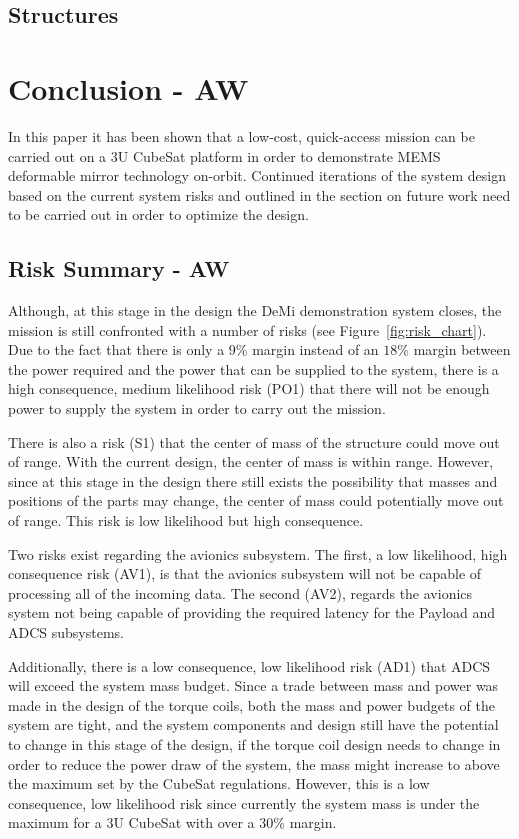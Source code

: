 \documentclass[12pt]{article}
\begin{document}

		\subsection{Structures}



\section{Conclusion - AW}

In this paper it has been shown that a low-cost, quick-access mission can be carried out on a 3U CubeSat platform in order to demonstrate MEMS deformable mirror technology on-orbit.  Continued iterations of the system design based on the current system risks and outlined in the section on future work need to be carried out in order to optimize the design.

		\subsection{Risk Summary - AW}

Although, at this stage in the design the DeMi demonstration system closes, the mission is still confronted with a number of risks (see Figure~\ref{fig:risk_chart}).  Due to the fact that there is only a $9\%$ margin instead of an $18\%$ margin between the power required and the power that can be supplied to the system, there is a high consequence, medium likelihood risk (PO1) that there will not be enough power to supply the system in order to carry out the mission.

There is also a risk (S1) that the center of mass of the structure could move out of range.  With the current design, the center of mass is within range.  However, since at this stage in the design there still exists the possibility that masses and positions of the parts may change, the center of mass could potentially move out of range.  This risk is low likelihood but high consequence.

Two risks exist regarding the avionics subsystem.  The first, a low likelihood, high consequence risk (AV1), is that the avionics subsystem will not be capable of processing all of the incoming data.  The second (AV2), regards the avionics system not being capable of providing the required latency for the Payload and ADCS subsystems. 

Additionally, there is a low consequence, low likelihood risk (AD1) that ADCS will exceed the system mass budget.  Since a trade between mass and power was made in the design of the torque coils, both the mass and power budgets of the system are tight, and the system components and design still have the potential to change in this stage of the design, if the torque coil design needs to change in order to reduce the power draw of the system, the mass might increase to above the maximum set by the CubeSat regulations.  However, this is a low consequence, low likelihood risk since currently the system mass is under the maximum for a 3U CubeSat with over a $30\%$ margin.
\end{document}
